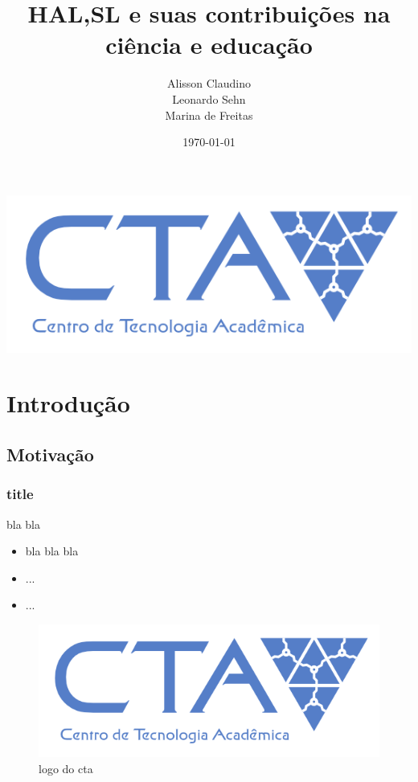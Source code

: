 \documentclass{beamer}
\begin{document}
\title
{ 
    HAL,SL e suas contribuições na ciência e educação
}

\author
{
    Alisson Claudino \\ Leonardo Sehn \\ Marina de Freitas
}
\logo
{
    \includegraphics[scale=0.15]{cta.png}
}
\date{\today}
\frame{\titlepage}


\section{Introdução}
\subsection{Motivação}

\frame
{
    \frametitle{title}
    \begin{beamerboxesrounded}[shadow=true]{bla bla}
        \begin{itemize}
            \item  bla bla bla
            \item ...
            \item ...
        \end{itemize}
    \end{beamerboxesrounded}
    
    \begin{figure}[hbt]
        \centering
        \includegraphics[scale=0.1]{cta.png}
        \caption{logo do cta}
        \label{fig:my_label}
    \end{figure}
    
    
}
\end{document}
